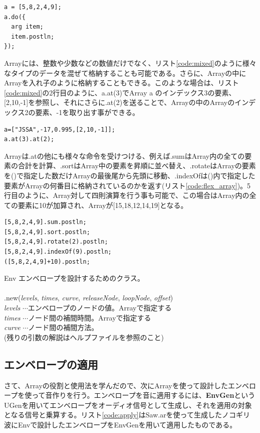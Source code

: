 \documentclass{jsarticle}
\begin{document}
\begin{lstlisting}[caption=イテレーション,label=code:itteration]
a = [5,8,2,4,9];
a.do({
  arg item;
  item.postln;
});
\end{lstlisting}

Arrayには、整数や少数などの数値だけでなく、リスト\ref{code:mixed}のように様々なタイプのデータを混ぜて格納することも可能である。さらに、Arrayの中にArrayを入れ子のように格納することもできる。このような場合は、リスト\ref{code:mixed}の2行目のように、a.at(3)でArray a のインデックス3の要素、[2,10,-1]を参照し、それにさらに.at(2)を送ることで、Arrayの中のArrayのインデックス2の要素、-1を取り出す事ができる。

\begin{lstlisting}[caption=Arrayに数値以外のものを格納する,label=code:mixed]
a=["JSSA",-17,0.995,[2,10,-1]];
a.at(3).at(2);
\end{lstlisting}

Arrayは.atの他にも様々な命令を受けつける、例えば.sumはArray内の全ての要素の合計を計算、.sortはArray中の要素を昇順に並べ替え、.rotateはArrayの要素を()で指定した数だけArrayの最後尾から先頭に移動、.indexOfは()内で指定した要素がArrayの何番目に格納されているのかを返す(リスト\ref{code:flex_array})。5行目のように、Array対して四則演算を行う事も可能で、この場合はArray内の全ての要素に10が加算され、Arrayが[15,18,12,14,19]となる。

\begin{lstlisting}[caption=Arrayの受け付ける様々な命令,label=code:flex_array]
[5,8,2,4,9].sum.postln;
[5,8,2,4,9].sort.postln;
[5,8,2,4,9].rotate(2).postln;
[5,8,2,4,9].indexOf(9).postln;
([5,8,2,4,9]+10).postln;
\end{lstlisting}

\begin{itembox}[l]{Env}
{\footnotesize 
エンベロープを設計するためのクラス。\\\\
.new({\it levels}, {\it times}, {\it curve}, {\it releaseNode}, {\it loopNode}, {\it offset})\\

{\it levels} $\cdots$エンベロープのノードの値。Arrayで指定する\\
{\it times} $\cdots$ノード間の補間時間。Arrayで指定する\\
{\it curve} $\cdots$ノード間の補間方法。\\
(残りの引数の解説はヘルプファイルを参照のこと)
}
\end{itembox}

\subsection{エンベロープの適用}
さて、Arrayの役割と使用法を学んだので、次にArrayを使って設計したエンベロープを使って音作りを行う。エンベロープを音に適用するには、{\bf EnvGen}というUGenを用いてエンベロープをオーディオ信号として生成し、それを適用の対象となる信号と乗算する。リスト\ref{code:apply}はSaw.arを使って生成したノコギリ波にEnvで設計したエンベロープをEnvGenを用いて適用したものである。
\end{document}
